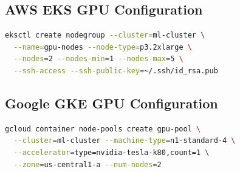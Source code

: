\documentclass[12pt,a4paper]{report}
\begin{document}
\subsection{AWS EKS GPU Configuration}
\begin{lstlisting}[language=bash,caption=EKS GPU Node Group,label=lst:aws-eks]
eksctl create nodegroup --cluster=ml-cluster \
  --name=gpu-nodes --node-type=p3.2xlarge \
  --nodes=2 --nodes-min=1 --nodes-max=5 \
  --ssh-access --ssh-public-key=~/.ssh/id_rsa.pub
\end{lstlisting}

\subsection{Google GKE GPU Configuration}
\begin{lstlisting}[language=bash,caption=GKE GPU Node Pool,label=lst:gcp-gke]
gcloud container node-pools create gpu-pool \
  --cluster=ml-cluster --machine-type=n1-standard-4 \
  --accelerator=type=nvidia-tesla-k80,count=1 \
  --zone=us-central1-a --num-nodes=2
\end{lstlisting}
\end{document}
